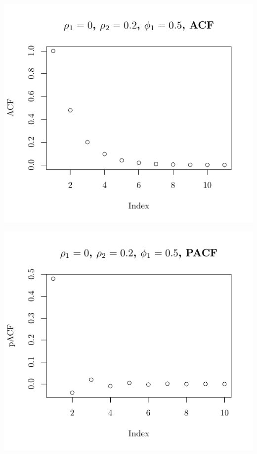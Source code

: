 \documentclass[10pt]{paper}\usepackage[]{graphicx}\usepackage[]{color}
\makeatletter
\def\maxwidth{ %
  \ifdim\Gin@nat@width>\linewidth
    \linewidth
  \else
    \Gin@nat@width
  \fi
}
\newenvironment{knitrout}{}{} %
\makeatother
\begin{document}
\begin{knitrout}
{\centering \includegraphics[width=\maxwidth]{figure/graphics-plotter-59} 

}




{\centering \includegraphics[width=\maxwidth]{figure/graphics-plotter-60} 

}





\end{knitrout}
\end{document}
